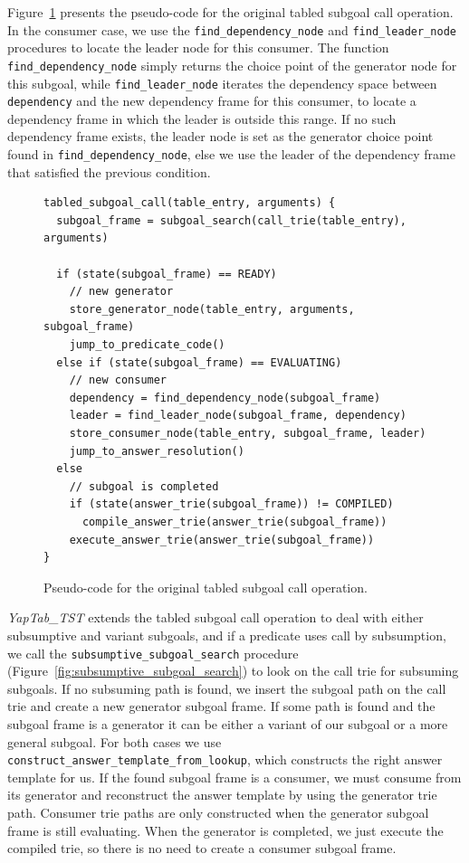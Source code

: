 Figure~\ref{fig:tabled_subgoal_call} presents the pseudo-code for the original tabled subgoal call operation.
In the consumer case, we use the \texttt{find\_dependency\_node} and \texttt{find\_leader\_node} procedures
to locate the leader node for this consumer. The function \texttt{find\_dependency\_node} simply
returns the choice point of the generator node for this subgoal, while \texttt{find\_leader\_node}
iterates the dependency space between \texttt{dependency} and the new dependency frame for this consumer,
to locate a dependency frame in which the leader is outside this range. If no such dependency frame
exists, the leader node is set as the generator choice point found in \texttt{find\_dependency\_node},
else we use the leader of the dependency frame that satisfied the previous condition. \cite{Rocha-PhD}

\begin{figure}[ht]
\begin{Verbatim}
tabled_subgoal_call(table_entry, arguments) {
  subgoal_frame = subgoal_search(call_trie(table_entry), arguments)
  
  if (state(subgoal_frame) == READY)
    // new generator
    store_generator_node(table_entry, arguments, subgoal_frame)
    jump_to_predicate_code()
  else if (state(subgoal_frame) == EVALUATING)
    // new consumer
    dependency = find_dependency_node(subgoal_frame)
    leader = find_leader_node(subgoal_frame, dependency)
    store_consumer_node(table_entry, subgoal_frame, leader)
    jump_to_answer_resolution()
  else
    // subgoal is completed
    if (state(answer_trie(subgoal_frame)) != COMPILED)
      compile_answer_trie(answer_trie(subgoal_frame))
    execute_answer_trie(answer_trie(subgoal_frame))
}
\end{Verbatim}
\caption{Pseudo-code for the original tabled subgoal call operation.}
\label{fig:tabled_subgoal_call}
\end{figure}

\textit{YapTab\_TST} extends the tabled subgoal call operation to deal with either subsumptive and variant subgoals,
and if a predicate uses call by subsumption, we call the \texttt{subsumptive\_subgoal\_search} procedure
(Figure~\ref{fig:subsumptive_subgoal_search}) to look on the call trie for subsuming subgoals.
If no subsuming path is found, we insert the subgoal path on the call trie and create a new generator
subgoal frame. If some path is found and the subgoal frame is a generator it can be either
a variant of our subgoal or a more general subgoal. For both cases
we use \texttt{construct\_answer\_template\_from\_lookup}, which constructs the right answer template for us.
If the found subgoal frame is a consumer, we must consume from its generator and reconstruct the answer
template by using the generator trie path.
Consumer trie paths are only constructed when the generator subgoal frame is still evaluating.
When the generator is completed, we just execute the compiled trie, so there is no need
to create a consumer subgoal frame.

